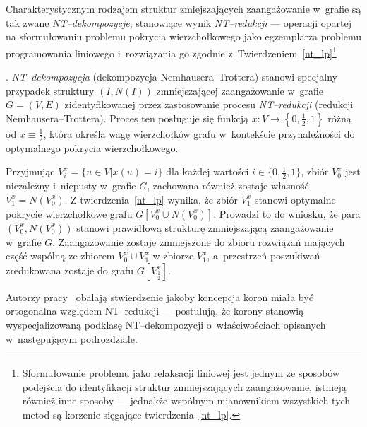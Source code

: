 \par{
  Charakterystycznym rodzajem struktur zmiejszających zaangażowanie w~grafie są tak zwane \emph{NT--dekompozycje}, stanowiące wynik \emph{NT--redukcji} --- operacji opartej na sformułowaniu problemu pokrycia wierzchołkowego jako egzemplarza problemu programowania liniowego i~rozwiązania go zgodnie z~Twierdzeniem~\ref{nt_lp}\footnote{Sformułowanie problemu jako relaksacji liniowej jest jednym ze sposobów podejścia do identyfikacji struktur zmniejszających zaangażowanie, istnieją również inne sposoby --- jednakże wspólnym mianownikiem wszystkich tych metod są korzenie sięgające twierdzenia~\ref{nt_lp}.}
  \begin{definition}.
    \emph{NT--dekompozycja} (dekompozycja Nemhausera--Trottera) stanowi specjalny przypadek struktury $(I, N(I))$ zmniejszającej zaangażowanie w~grafie $G=(V, E)$ zidentyfikowanej przez zastosowanie procesu \emph{NT--redukcji} (redukcji Nemhausera--Trottera).
    Proces ten posługuje się funkcją $x: V \rightarrow \left\{0, \frac{1}{2}, 1\right\}$ różną od $x \equiv \frac{1}{2}$, która określa wagę wierzchołków grafu w~kontekście przynależności do optymalnego pokrycia wierzchołkowego.
  \end{definition}
  Przyjmując $V_i^x=\{u \in V| x(u)=i\}$ dla każdej wartości $i\in \{0, \frac{1}{2}, 1\}$, zbiór $V_0^x$ jest niezależny i~niepusty w~grafie $G$, zachowana również zostaje własność $V_1^x = N(V_0^x)$.
  Z twierdzenia~\ref{nt_lp} wynika, że zbiór $V_1^x$ stanowi optymalne pokrycie wierzchołkowe grafu $G[V_0^x \cup N(V_0^x)]$.
  Prowadzi to do wniosku, że para $(V_0^x, N(V_0^x))$ stanowi prawidłową strukturę zmniejszającą zaangażowanie w~grafie $G$.
  Zaangażowanie zostaje zmniejszone do zbioru rozwiązań mających część wspólną ze zbiorem $V_0^x \cup V_1^x$ w zbiorze $V_1^x$, a~przestrzeń poszukiwań zredukowana zostaje do grafu $G[V_\frac{1}{2}^x]$.
}
\par{
  Autorzy pracy~\cite{chlebik:crown} obalają stwierdzenie jakoby koncepcja koron miała być ortogonalna względem NT--redukcji --- postulują, że korony stanowią wyspecjalizowaną podklasę NT--dekompozycji o~właściwościach opisanych w~następującym podrozdziale.
}
